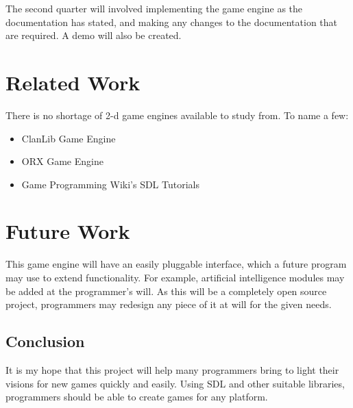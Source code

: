\documentclass[12pt]{article}
\begin{document}
    The second quarter will involved implementing the game engine as the documentation has stated, and making any changes to the documentation that are required. A demo will also be created.

  \section{Related Work}
    There is no shortage of 2-d game engines available to study from. To name a few:
    \begin{itemize}
      \item ClanLib Game Engine
      \item ORX Game Engine
      \item Game Programming Wiki's SDL Tutorials
    \end{itemize}

  \section{Future Work}
    This game engine will have an easily pluggable interface, which a future program may use to extend functionality. For example, artificial intelligence modules may be added at the programmer's will. As this will be a completely open source project, programmers may redesign any piece of it at will for the given needs.

  \subsection{Conclusion}
    It is my hope that this project will help many programmers bring to light their visions for new games quickly and easily. Using SDL and other suitable libraries, programmers should be able to create games for any platform.
\end{document}
